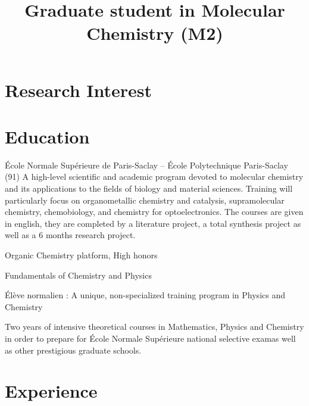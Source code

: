 \documentclass[11pt,a4paper,sans]{moderncv}
\title{Graduate student in Molecular Chemistry (M2)}
\begin{document}
\makecvtitle

%
\section{Research Interest}
%
%
\section{Education}
%
{{\newline}École Normale Supérieure de Paris-Saclay -- École Polytechnique}%
{Paris-Saclay (91)}{}%
{A high-level scientific and academic program devoted to molecular chemistry and its applications to the fields of biology and material sciences. Training will particularly focus on organometallic chemistry and catalysis, supramolecular chemistry, chemobiology, and chemistry for optoelectronics. The courses are given in english, they are completed by a literature project, a total synthesis project as well as a 6 months research project.{\newline}}

%
%
{Organic Chemistry platform, High honors}

%
{Fundamentals of Chemistry and Physics}

%
{Élève normalien : A unique, non-specialized training program in Physics and Chemistry}

%
{Two years of intensive theoretical courses in Mathematics, Physics and Chemistry in order to prepare for École Normale Supérieure national selective examas well as other prestigious graduate schools.}

%

\section{Experience}
%
\end{document}
